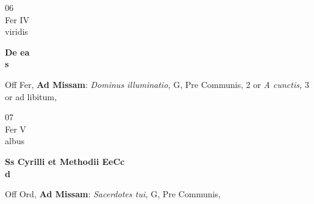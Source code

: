 \documentclass[10pt, openany]{book}
\begin{document}
        \begin{center}
            \begin{minipage}{3.5in}
                \vspace{2em}
                \begin{minipage}{0.5in}
                    {\Huge 06} \\
                    {\normalsize Fer IV} \\
                    {\normalsize viridis}
                \end{minipage}
                \begin{minipage}{3.0in}
                    \textbf{ \large De ea \\
                    \textnormal{\normalsize s}} \\ 
                \end{minipage}
                \begin{justify}Off Fer, \textbf{Ad Missam}: \textit{Dominus illuminatio,} G, Pre Communis, 2 or \textit{A cunctis,} 3 or ad libitum,   
                \end{justify}
            \end{minipage}
        \end{center}
    
        \begin{center}
            \begin{minipage}{3.5in}
                \vspace{2em}
                \begin{minipage}{0.5in}
                    {\Huge 07} \\
                    {\normalsize Fer V} \\
                    {\normalsize albus}
                \end{minipage}
                \begin{minipage}{3.0in}
                    \textbf{ \large Ss Cyrilli et Methodii EeCc \\
                    \textnormal{\normalsize d}} \\ 
                \end{minipage}
                \begin{justify}Off Ord, \textbf{Ad Missam}: \textit{Sacerdotes tui,} G, Pre Communis,   
                \end{justify}
            \end{minipage}
        \end{center}
    
\end{document}
